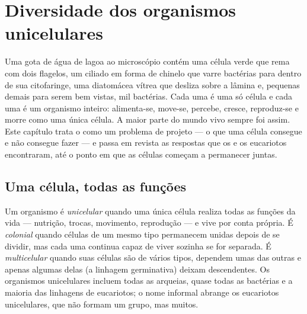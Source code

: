 \chapter{Diversidade dos organismos unicelulares}\label{ch:b2:unicellular-diversity}

Uma gota de água de lagoa ao microscópio contém uma célula verde que
rema com dois flagelos, um ciliado em forma de chinelo que varre
bactérias para dentro de sua citofaringe, uma diatomácea vítrea que
desliza sobre a lâmina e, pequenas demais para serem bem vistas, mil
bactérias. Cada uma é uma só célula e cada uma é um organismo inteiro:
alimenta-se, move-se, percebe, cresce, reproduz-se e morre como uma
única célula. A maior parte do mundo vivo sempre foi assim. Este
capítulo trata o  como um problema de projeto ---
o que uma célula consegue e não consegue fazer --- e passa em revista
as respostas que os  e os eucariotos encontraram, até o
ponto em que as células começam a permanecer juntas.

\section{Uma célula, todas as funções}

\begin{definition}\label{def:b2:unicellular-diversity:unicellular}
Um organismo é \emph{unicelular} quando
uma única célula realiza todas as funções da vida --- nutrição,
trocas, movimento, reprodução --- e vive por conta própria. É
\emph{colonial} quando células de um mesmo
tipo permanecem unidas depois de se dividir, mas cada uma continua
capaz de viver sozinha se for separada. É
\emph{multicelular} quando suas células
são de vários tipos, dependem umas das outras e apenas algumas delas
(a linhagem germinativa) deixam descendentes. Os organismos
unicelulares incluem todas as arqueias, quase todas as bactérias e a
maioria das linhagens de eucariotos; o nome informal
\emph{} abrange os eucariotos unicelulares, que não formam um
grupo, mas muitos.
\end{definition}

